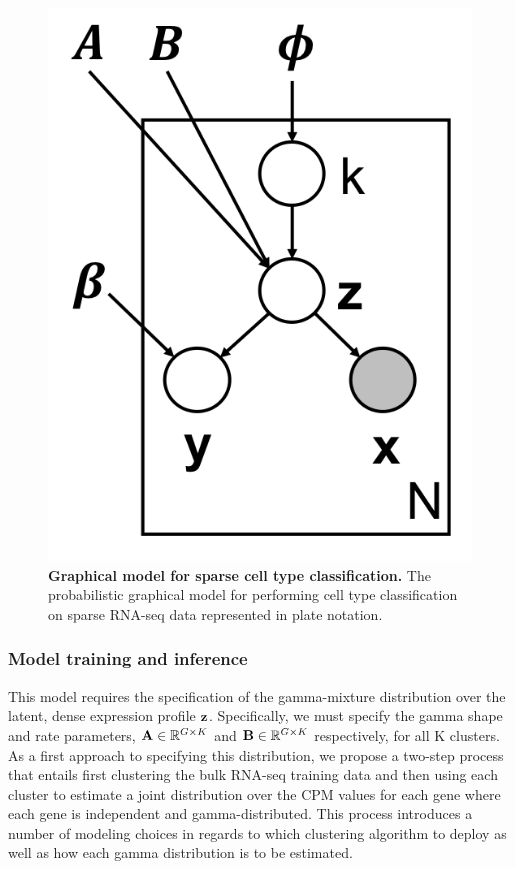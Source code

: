  \begin{figure}[h!]
      \centerline{\includegraphics[scale=0.65]{figures/sc_graphical_model.png}}
      \caption{\textbf{Graphical model for sparse cell type classification.} The probabilistic graphical model for performing cell type classification on sparse RNA-seq data represented in plate notation.}
      \label{fig:sc_graphical_model}
      \end{figure}

\subsubsection{Model training and inference}

This model requires the specification of the gamma-mixture distribution over the latent, dense expression profile $\bold{z}$.  Specifically, we must specify the gamma shape and rate parameters, $\bold{A} \in \mathbb{R}^{G \times K}$ and $\bold{B} \in \mathbb{R}^{G \times K}$ respectively, for all K clusters.  As a first approach to specifying this distribution, we propose a two-step process that entails first clustering the bulk RNA-seq training data and then using each cluster to estimate a joint distribution over the CPM values for each gene where each gene is independent and gamma-distributed.    This process introduces a number of modeling choices in regards to which clustering algorithm to deploy as well as how each gamma distribution is to be estimated.

